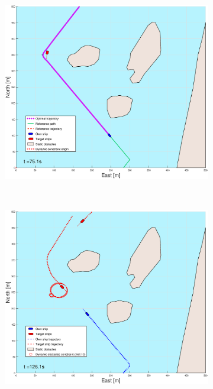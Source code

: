 \begin{figure}[!ht]
\begin{subfigure}[b]{0.49\textwidth}
    \end{subfigure}
    \hfill
    \begin{subfigure}[b]{0.499\textwidth}
        \centering
        \includegraphics[width=\textwidth]{Images/Figures/Helloya/_Simple_0fig999_time=75}
    \end{subfigure}
    \hfill
    \\\begin{subfigure}[b]{0.49\textwidth}
        \centering
        \includegraphics[width=\textwidth]{Images/Figures/Helloya/_Simple_0fig1_time=126}

\end{subfigure}
\end{figure}
